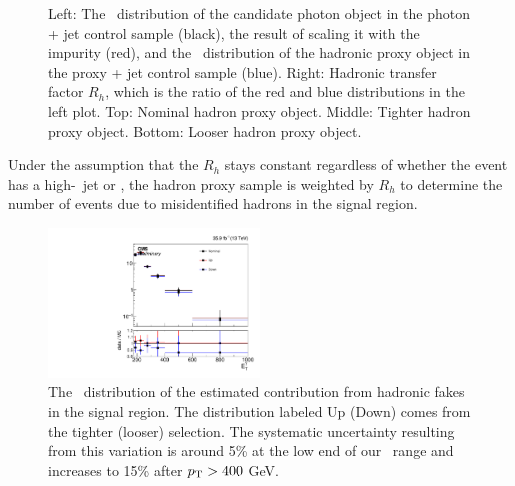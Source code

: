 \begin{figure}[htbp]
{  }
  \caption{
    Left: The \pt\ distribution of the candidate photon object in the photon + jet control sample (black), the result of scaling it with the impurity (red), and the \pt\ distribution of the hadronic proxy object in the proxy + jet control sample (blue).
    Right: Hadronic transfer factor $R_{h}$, which is the ratio of the red and blue distributions in the left plot. 
    Top: Nominal hadron proxy object. 
    Middle: Tighter hadron proxy object. 
    Bottom: Looser hadron proxy object.
  }
  \label{fig:hadronTFactor}
\end{figure}


Under the assumption that the $R_{h}$ stays constant regardless of whether the event has a high-\pt\ jet or \met, the hadron proxy sample is weighted by $R_{h}$ to determine the number of events due to misidentified hadrons in the signal region.

\begin{figure}[htbp]
  \centering
  \includegraphics[width=0.5\textwidth]{Analysis/Figures/hfake/shape_sample.pdf}
  \caption{
    The \pt\ distribution of the estimated contribution from hadronic fakes in the signal region. 
    The distribution labeled Up (Down) comes from the tighter (looser) selection. 
    The systematic uncertainty resulting from this variation is around 5\% at the low end of our \pt\ range and increases to 15\% after $p_{\mathrm{T}} > 400$ GeV.
  }
  \label{fig:hadronFakeShapes}
\end{figure}

